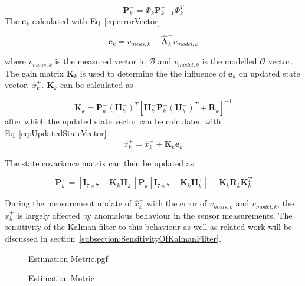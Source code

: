 \begin{equation}
	\mathbf{P}_k^- = \Phi_k \mathbf{P}_{k-1}^+ \Phi_k ^T
	\label{eq:P_k}
\end{equation}
The $\mathbf{e}_k$ calculated with Eq~\ref{eq:errorVector}

\begin{equation}
	\mathbf{e}_k = v_{meas,k} - \hat{\boldsymbol{A}}_k^- v_{model,k}
	\label{eq:errorVector}
\end{equation}

where $v_{meas,k}$ is the measured vector in $\mathbf{\mathcal{B}}$ and $v_{model,k}$ is the modelled $\mathbf{\mathcal{O}}$ vector. The gain matrix $\mathbf{K}_k$ is used to determine the the influence of $\mathbf{e}_k$ on updated state vector, $\hat{x}_k^+$. $\mathbf{K}_k$ can be calculated as 

\begin{equation}
	\mathbf{K}_k = \mathbf{P}_k^- (\mathbf{H}_k^-)^T \left[\mathbf{H}_k^- \mathbf{P}_k^- (\mathbf{H}_k^-)^T + \mathbf{R}_k \right]^{-1}
\end{equation}
after which the updated state vector can be calculated with Eq~\ref{eq:UpdatedStateVector}
\begin{equation}
	\hat{x}_k^+ = \hat{x}_k^- + \mathbf{K}_k \mathbf{e}_k
	\label{eq:UpdatedStateVector}
\end{equation}

The state covariance matrix can then be updated as

\begin{equation}
	\mathbf{P}_k^+ = \left[\mathbf{I}_{7 \times 7} - \mathbf{K}_k \mathbf{H}_k^+ \right]\mathbf{P}_k \left[\mathbf{I}_{7 \times 7} - \mathbf{K}_k \mathbf{H}_k^+ \right] + \mathbf{K}_k \mathbf{R}_k \mathbf{K}_k^T
	\label{eq:Updated_P_k}
\end{equation}

During the measurement update of $\hat{x}_k^-$ with the error of $v_{meas,k}$ and $v_{model,k}$, the $\hat{x}_k^+$ is largely affected by anomalous behaviour in the sensor measurements. The sensitivity of the Kalman filter to this behaviour as well as related work will be discussed in section~\ref{subsection:SensitivityOfKalmanFilter}.

\begin{figure}[!htb]
	\centering
	\def\pgfwidth{10cm}
	{Estimation Metric.pgf}
	
	\caption{Estimation Metric}
	\label{fig:Estimation Metric}
\end{figure}



